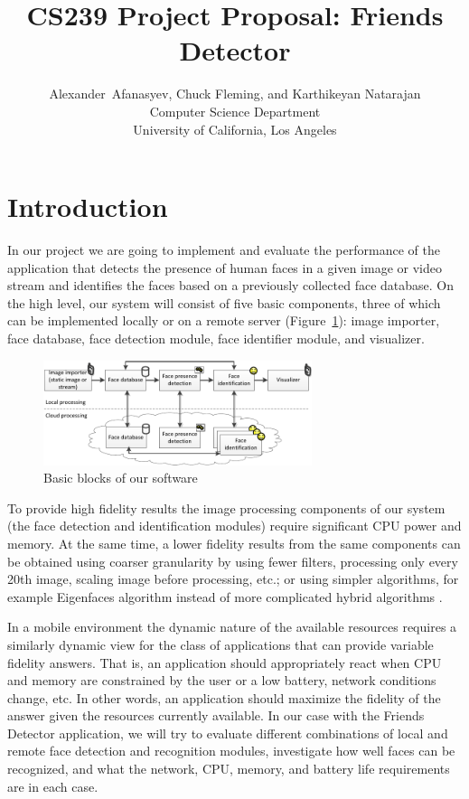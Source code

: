 \documentclass[conference]{IEEEtran}
\title{CS239 Project Proposal: Friends Detector}
\author{Alexander~Afanasyev, Chuck Fleming, and Karthikeyan Natarajan \\
\small Computer Science Department \\
\small University of California, Los Angeles 
}
\begin{document}
\maketitle

\section{Introduction}

In our project we are going to implement and evaluate the performance of the application that detects the presence of human faces in a given image or video stream and identifies the faces based on a previously collected face database. On the high level, our system will consist of five basic components, three of which can be implemented locally or on a remote server (Figure~\ref{fig:basic blocks}): image importer, face database, face detection module, face identifier module, and visualizer. 

\begin{figure}[htbp]
	\centering
		\includegraphics[width=0.7\textwidth]{basic_blocks}
	\caption{Basic blocks of our software}
	\label{fig:basic blocks}
\end{figure}

To provide high fidelity results the image processing components of our system (the face detection and identification modules) require significant CPU power and memory.  At the same time, a lower fidelity results from the same components can be obtained using coarser granularity by using fewer filters, processing only every 20th image, scaling image before processing, etc.; or using simpler algorithms, for example Eigenfaces algorithm \cite{Turk:1991:Eigenfaces-for-recognition} instead of more complicated hybrid algorithms \cite{Zhao:2003:Face-recognition:}. 

In a mobile environment the dynamic nature of the available resources requires a similarly dynamic view for the class of applications that can provide variable fidelity answers. That is, an application should appropriately react when CPU and memory are constrained by the user or a low battery, network conditions change, etc. In other words, an application should maximize the fidelity of the answer given the resources currently available. In our case with the Friends Detector application, we will try to evaluate different combinations of local and remote face detection and recognition modules, investigate how well faces can be recognized, and what the network, CPU, memory, and battery life requirements are in each case.
\end{document}
